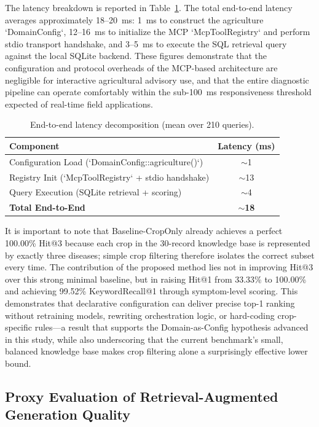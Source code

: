 \documentclass[11pt,a4paper]{article}
\begin{document}
The latency breakdown is reported in Table~\ref{tab:latency_results}. The total end-to-end latency averages approximately 18--20~ms: 1~ms to construct the agriculture `DomainConfig`, 12--16~ms to initialize the MCP `McpToolRegistry` and perform stdio transport handshake, and 3--5~ms to execute the SQL retrieval query against the local SQLite backend. These figures demonstrate that the configuration and protocol overheads of the MCP-based architecture are negligible for interactive agricultural advisory use, and that the entire diagnostic pipeline can operate comfortably within the sub-100~ms responsiveness threshold expected of real-time field applications.

\begin{table}[htbp]
\centering
\caption{End-to-end latency decomposition (mean over 210 queries).}
\label{tab:latency_results}
\begin{tabular}{lc}
\hline
\textbf{Component} & \textbf{Latency (ms)} \\
\hline
Configuration Load (`DomainConfig::agriculture()`) & $\sim$1 \\
Registry Init (`McpToolRegistry` + stdio handshake) & $\sim$13 \\
Query Execution (SQLite retrieval + scoring)         & $\sim$4 \\
\hline
\textbf{Total End-to-End}                           & \textbf{$\sim$18} \\
\hline
\end{tabular}
\end{table}

It is important to note that Baseline-CropOnly already achieves a perfect 100.00\% Hit@3 because each crop in the 30-record knowledge base is represented by exactly three diseases; simple crop filtering therefore isolates the correct subset every time. The contribution of the proposed method lies not in improving Hit@3 over this strong minimal baseline, but in raising Hit@1 from 33.33\% to 100.00\% and achieving 99.52\% KeywordRecall@1 through symptom-level scoring. This demonstrates that declarative configuration can deliver precise top-1 ranking without retraining models, rewriting orchestration logic, or hard-coding crop-specific rules---a result that supports the Domain-as-Config hypothesis advanced in this study, while also underscoring that the current benchmark's small, balanced knowledge base makes crop filtering alone a surprisingly effective lower bound.

\subsection{Proxy Evaluation of Retrieval-Augmented Generation Quality}
\end{document}
